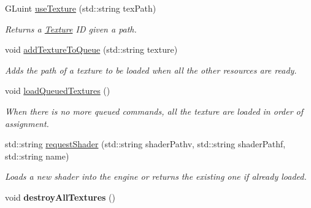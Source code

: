 \begin{DoxyCompactItemize}
\item 
G\+Luint \hyperlink{class_resource_manager_a387876b621fafcf12ca31f3c23a35c5a}{use\+Texture} (std\+::string tex\+Path)
\begin{DoxyCompactList}\small\item\em Returns a \hyperlink{struct_texture}{Texture} ID given a path. \end{DoxyCompactList}\item 
void \hyperlink{class_resource_manager_afc152b5b5383745636924a18fcbbac47}{add\+Texture\+To\+Queue} (std\+::string texture)
\begin{DoxyCompactList}\small\item\em Adds the path of a texture to be loaded when all the other resources are ready. \end{DoxyCompactList}\item 
void \hyperlink{class_resource_manager_ad45541223c9f21701bf75107c5369203}{load\+Queued\+Textures} ()
\begin{DoxyCompactList}\small\item\em When there is no more queued commands, all the texture are loaded in order of assignment. \end{DoxyCompactList}\item 
std\+::string \hyperlink{class_resource_manager_a8a981cfea7bc21774000932f9bcc0b34}{request\+Shader} (std\+::string shader\+Pathv, std\+::string shader\+Pathf, std\+::string name)
\begin{DoxyCompactList}\small\item\em Loads a new shader into the engine or returns the existing one if already loaded. \end{DoxyCompactList}\item 
void {\bfseries destroy\+All\+Textures} ()\hypertarget{class_resource_manager_a28da80dabb6ff7873cc6bb4eb709648a}{}\label{class_resource_manager_a28da80dabb6ff7873cc6bb4eb709648a}


\end{DoxyCompactItemize}
